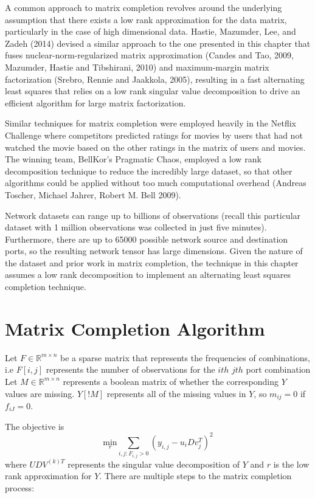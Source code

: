 \documentclass[12pt,twoside]{dukestatscithesis}
\theoremstyle{definition}
\theoremstyle{definition}
\theoremstyle{definition}
\theoremstyle{remark}
\begin{document}
A common approach to matrix completion revolves around the underlying
assumption that there exists a low rank approximation for the data
matrix, particularly in the case of high dimensional data. Hastie,
Mazumder, Lee, and Zadeh (2014) devised a similar approach to the one
presented in this chapter that fuses nuclear-norm-regularized matrix
approximation (Candes and Tao, 2009, Mazumder, Hastie and Tibshirani,
2010) and maximum-margin matrix factorization (Srebro, Rennie and
Jaakkola, 2005), resulting in a fast alternating least squares that
relies on a low rank singular value decomposition to drive an efficient
algorithm for large matrix factorization.

Similar techniques for matrix completion were employed heavily in the
Netflix Challenge where competitors predicted ratings for movies by
users that had not watched the movie based on the other ratings in the
matrix of users and movies. The winning team, BellKor's Pragmatic Chaos,
employed a low rank decomposition technique to reduce the incredibly
large dataset, so that other algorithms could be applied without too
much computational overhead (Andreas Toscher, Michael Jahrer, Robert M.
Bell 2009).

Network datasets can range up to billions of observations (recall this
particular dataset with 1 million observations was collected in just
five minutes). Furthermore, there are up to 65000 possible network
source and destination ports, so the resulting network tensor has large
dimensions. Given the nature of the dataset and prior work in matrix
completion, the technique in this chapter assumes a low rank
decomposition to implement an alternating least squares completion
technique.

\section{Matrix Completion Algorithm}\label{matrix-completion-algorithm}

Let \(F \in \mathbb{R}^{m \times n}\) be a sparse matrix that represents
the frequencies of combinations, i.e \(F[i,j]\) represents the number of
observations for the \(ith\) \(jth\) port combination Let
\(M \in \mathbb{R}^{m \times n}\) represents a boolean matrix of whether
the corresponding \(Y\) values are missing. \(Y[!M]\) represents all of
the missing values in \(Y\), so \(m_{ij} = 0\) if \(f_{iJ} = 0\).

The objective is
\[\underset{r}{\text{min}} \sum_{i,j:F_{i,j} > 0} (y_{i,j} - u_iDv^T_j)^2\]
where \(UDV^{(k)T}\) represents the singular value decomposition of
\(Y\) and \(r\) is the low rank approximation for \(Y\). There are
multiple steps to the matrix completion process:
\end{document}
